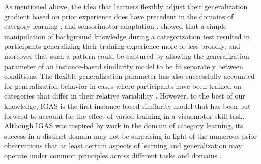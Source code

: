 \documentclass[
  12pt,
  letterpaper,
]{article}
\begin{document}
As mentioned above, the idea that learners flexibly adjust their
generalization gradient based on prior experience does have precedent in
the domains of category learning
\autocite{ahaConceptLearningFlexible1992,briscoeConceptualComplexityBias2011,hahnEffectsCategoryDiversity2005,lambertsFlexibleTuningSimilarity1994,opdebeeckRepresentationPerceivedShape2008},
and sensorimotor adaptation
\autocite{marongelliAdvantageFlexibleNeuronal2013,taylorContextdependentGeneralization2013,thoroughmanRapidReshapingHuman2005}.
\textcite{lambertsFlexibleTuningSimilarity1994} showed that a simple
manipulation of background knowledge during a categorization test
resulted in participants generalizing their training experience more or
less broadly, and moreover that such a pattern could be captured by
allowing the generalization parameter of an instance-based similarity
model to be fit separately between conditions. The flexible
generalization parameter has also successfully accounted for
generalization behavior in cases where participants have been trained on
categories that differ in their relative variability
\autocite{hahnEffectsCategoryDiversity2005,sakamotoTrackingVariabilityLearning2006}.
However, to the best of our knowledge, IGAS is the first instance-based
similarity model that has been put forward to account for the effect of
varied training in a visuomotor skill task. Although IGAS was inspired
by work in the domain of category learning, its success in a distinct
domain may not be surprising in light of the numerous prior observations
that at least certain aspects of learning and generalization may operate
under common principles across different tasks and domains
\autocite{censorCommonMechanismsHuman2012,hillsCentralExecutiveSearch2010,jamiesonInstanceTheoryDomaingeneral2022,lawSharedMechanismsPerceptual2010,roarkComparingPerceptualCategory2021,rosenbaumAcquisitionIntellectualPerceptualMotor2001,vigoLearningDifficultyVisual2018,wallIdentifyingRelationshipsCognitive2021,wuSimilaritiesDifferencesSpatial2020,yangGeneralLearningAbility2020}.
\end{document}
